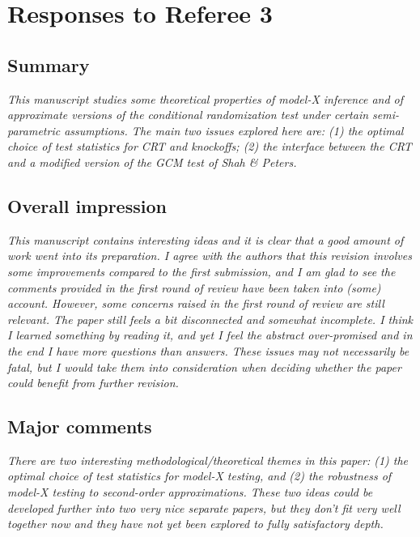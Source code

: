 \documentclass[12pt]{article}
\begin{document}
\section{Responses to Referee 3}

\subsection{Summary}

\textsl{This manuscript studies some theoretical properties of model-X inference and of approximate versions of the conditional randomization test under certain semi-parametric assumptions. The main two issues explored here are: (1) the optimal choice of test statistics for CRT and knockoffs; (2) the interface between the CRT and a modified version of the GCM test of Shah \& Peters.}

\subsection{Overall impression}

\textsl{This manuscript contains interesting ideas and it is clear that a good amount of work went into its preparation. I agree with the authors that this revision involves some improvements compared to the first submission, and I am glad to see the comments provided in the first round of review have been taken into (some) account. However, some concerns raised in the first round of review are still relevant. The paper still feels a bit disconnected and somewhat incomplete. I think I learned something by reading it, and yet I feel the abstract over-promised and in the end I have more questions than answers. These issues may not necessarily be fatal, but I would take them into consideration when deciding whether the paper could benefit from further revision.}

\subsection{Major comments}

\textsl{There are two interesting methodological/theoretical themes in this paper: (1) the optimal choice of test statistics for  model-X testing, and (2) the robustness of model-X testing to second-order approximations. These two ideas could be developed further into two very nice separate papers, but they don’t fit very well together now and they have not yet been explored to fully satisfactory depth.}
\end{document}
